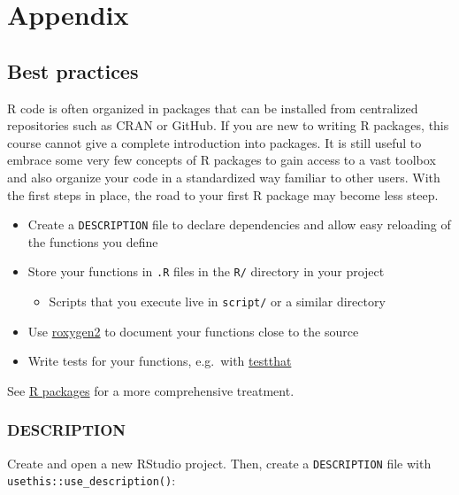 \documentclass[]{book}
\providecommand{\tightlist}{%
  \setlength{\itemsep}{0pt}\setlength{\parskip}{0pt}}
\begin{document}
\hypertarget{part-appendix}{%
\part{Appendix}\label{part-appendix}}

\hypertarget{best-practices}{%
\chapter{Best practices}\label{best-practices}}

R code is often organized in packages that can be installed from centralized repositories such as CRAN or GitHub.
If you are new to writing R packages, this course cannot give a complete introduction into packages.
It is still useful to embrace some very few concepts of R packages to gain access to a vast toolbox and also organize your code in a standardized way familiar to other users.
With the first steps in place, the road to your first R package may become less steep.

\begin{itemize}
\tightlist
\item
  Create a \texttt{DESCRIPTION} file to declare dependencies and allow easy reloading of the functions you define
\item
  Store your functions in \texttt{.R} files in the \texttt{R/} directory in your project

  \begin{itemize}
  \tightlist
  \item
    Scripts that you execute live in \texttt{script/} or a similar directory
  \end{itemize}
\item
  Use \href{https://github.com/klutometis/roxygen}{roxygen2} to document your functions close to the source
\item
  Write tests for your functions, e.g.~with \href{https://testthat.r-lib.org/}{testthat}
\end{itemize}

See \href{http://r-pkgs.had.co.nz/}{R packages} for a more comprehensive treatment.

\hypertarget{description}{%
\section{DESCRIPTION}\label{description}}

Create and open a new RStudio project.
Then, create a \texttt{DESCRIPTION} file with \texttt{usethis::use\_description()}:
\end{document}
